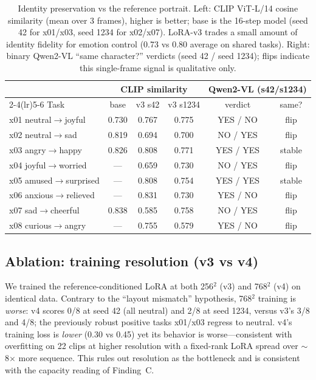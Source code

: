 \documentclass[10pt,twocolumn]{article}
\begin{document}
\begin{table}[t]
\centering\small
\caption{Identity preservation vs the reference portrait. Left: CLIP ViT-L/14 cosine similarity
(mean over 3 frames), higher is better; base is the 16-step model (seed 42 for x01/x03, seed 1234
for x02/x07). LoRA-v3 trades a small amount of identity fidelity for emotion control (0.73 vs 0.80
average on shared tasks). Right: binary Qwen2-VL ``same character?'' verdicts (seed 42 / seed 1234);
flips indicate this single-frame signal is qualitative only.}
\label{tab:identity}
\begin{tabular}{@{}lccccc@{}}
\toprule
 & \multicolumn{3}{c}{CLIP similarity} & \multicolumn{2}{c}{Qwen2-VL (s42/s1234)}\\
\cmidrule(lr){2-4}\cmidrule(lr){5-6}
Task & base & v3 s42 & v3 s1234 & verdict & same?\\
\midrule
x01 neutral$\rightarrow$joyful & 0.730 & 0.767 & 0.775 & YES / NO & flip\\
x02 neutral$\rightarrow$sad & 0.819 & 0.694 & 0.700 & NO / YES & flip\\
x03 angry$\rightarrow$happy & 0.826 & 0.808 & 0.771 & YES / YES & stable\\
x04 joyful$\rightarrow$worried & --- & 0.659 & 0.730 & NO / YES & flip\\
x05 amused$\rightarrow$surprised & --- & 0.808 & 0.754 & YES / YES & stable\\
x06 anxious$\rightarrow$relieved & --- & 0.831 & 0.730 & YES / NO & flip\\
x07 sad$\rightarrow$cheerful & 0.838 & 0.585 & 0.758 & NO / YES & flip\\
x08 curious$\rightarrow$angry & --- & 0.755 & 0.579 & YES / NO & flip\\
\bottomrule
\end{tabular}
\end{table}

\subsection{Ablation: training resolution (v3 vs v4)}
We trained the reference-conditioned LoRA at both 256$^2$ (v3) and 768$^2$ (v4) on identical data.
Contrary to the ``layout mismatch'' hypothesis, 768$^2$ training is \emph{worse}: v4 scores 0/8 at
seed 42 (all neutral) and 2/8 at seed 1234, versus v3's 3/8 and 4/8; the previously robust positive
tasks x01/x03 regress to neutral. v4's training loss is \emph{lower} (0.30 vs 0.45) yet its
behavior is worse---consistent with overfitting on 22 clips at higher resolution with a fixed-rank
LoRA spread over $\sim$8$\times$ more sequence. This rules out resolution as the bottleneck and
is consistent with the capacity reading of Finding~C.
\end{document}
